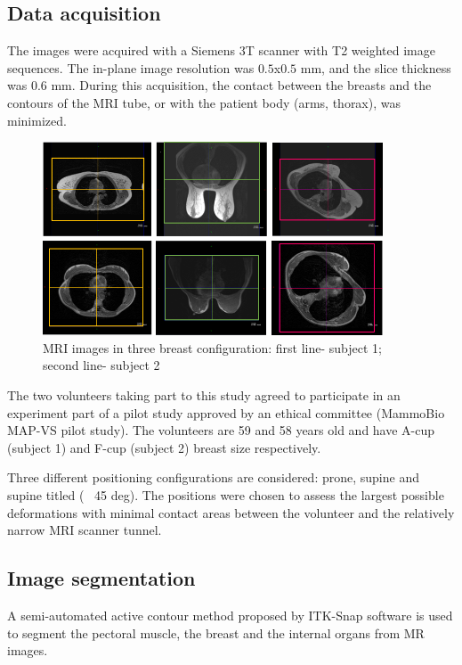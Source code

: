 \subsection{Data acquisition}%

 The images were acquired with a Siemens 3T scanner with T2 weighted image sequences. The in-plane image resolution was $0.5$x$0.5$ mm, and the slice thickness was 0.6 mm. During this acquisition, the contact between the breasts and the contours of the MRI tube, or with the patient body (arms, thorax), was minimized.
\begin{figure}[H]
\centering
\includegraphics[width=0.9\textwidth,keepaspectratio]{figures/patientData.png} 
\caption{MRI images in three breast configuration: first line- subject 1; second line- subject 2}\label{fig:patientdata}
\end{figure}

The two volunteers taking part to this study agreed to participate in an experiment part of a pilot study approved by an ethical committee (MammoBio MAP-VS pilot study). The volunteers are 59 and 58 years old and have A-cup (subject 1) and F-cup (subject 2) breast size respectively. 

Three different positioning configurations are considered: prone, supine and supine titled (~ 45 deg). The positions were chosen to assess the largest possible deformations with minimal contact areas between the volunteer and the relatively narrow MRI scanner tunnel. 


\subsection{Image segmentation}%

A semi-automated active contour method proposed by ITK-Snap software is used to segment the pectoral muscle, the breast and the internal organs from MR images. 

